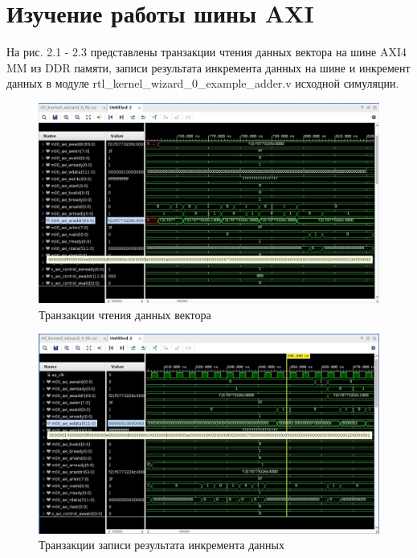 \chapter{Изучение работы шины AXI}

На рис. 2.1 - 2.3 представлены транзакции чтения данных вектора на шине AXI4 MM из DDR памяти, записи результата инкремента данных на шине и инкремент данных в модуле rtl\_kernel\_wizard\_0\_example\_adder.v исходной симуляции.

\begin{figure}[H]
	\begin{center}
		\includegraphics[scale=0.5]{assets/read_def.png}
	\end{center}
	\caption{Транзакции чтения данных вектора}
\end{figure}

\begin{figure}[H]
	\begin{center}
		\includegraphics[scale=0.5]{assets/write_def.png}
	\end{center}
	\caption{Транзакции записи результата инкремента данных}
\end{figure}

